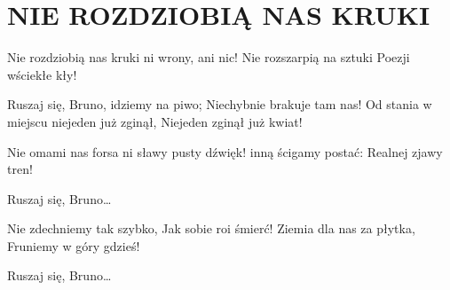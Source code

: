 \documentclass[../../../songbook.tex]{subfiles}
\begin{document}
\TabPositions{8cm} %
\section*{NIE ROZDZIOBIĄ NAS KRUKI}
{}
\vspace{0.5cm}
Nie rozdziobią nas kruki	 \newline	
ni wrony, ani nic!			 \newline	
Nie rozszarpią na sztuki	 \newline	
Poezji wściekłe kły!		 \newline	

\-\hspace{1cm} Ruszaj się, Bruno, idziemy na piwo;		 \newline
\-\hspace{1cm} Niechybnie brakuje tam nas!				 \newline		
\-\hspace{1cm} Od stania w miejscu niejeden już zginął,	 \newline	
\-\hspace{1cm} Niejeden zginął już kwiat!				 \newline	

Nie omami nas forsa		\newline
ni sławy pusty dźwięk!		\newline
inną ścigamy postać:		\newline
Realnej zjawy tren!		\newline

\-\hspace{1cm} Ruszaj się, Bruno…		\newline

Nie zdechniemy tak szybko,		\newline
Jak sobie roi śmierć!		\newline
Ziemia dla nas za płytka,		\newline
Fruniemy w góry gdzieś!		\newline

\-\hspace{1cm} Ruszaj się, Bruno…		\newline
\end{document}
